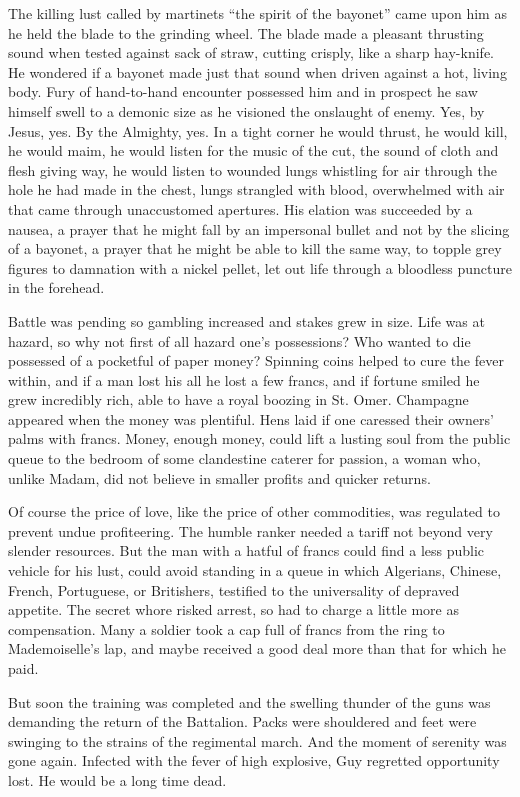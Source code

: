 The killing lust called by martinets ``the spirit of the bayonet'' came upon him as he held the blade to the grinding wheel. The blade made a pleasant thrusting sound when tested against sack of straw, cutting crisply, like a sharp hay-knife. He wondered if a bayonet made just that sound when driven against a hot, living body. Fury of hand-to-hand encounter possessed him and in prospect he saw himself swell to a demonic size as he visioned the onslaught of enemy. Yes, by Jesus, yes. By the Almighty, yes. In a tight corner he would thrust, he would kill, he would maim, he would listen for the music of the cut, the sound of cloth and flesh giving way, he would listen to wounded lungs whistling for air through the hole he had made in the chest, lungs strangled with blood, overwhelmed with air that came through unaccustomed apertures. His elation was succeeded by a nausea, a prayer that he might fall by an impersonal bullet and not by the slicing of a bayonet, a prayer that he might be able to kill the same way, to topple grey figures to damnation with a nickel pellet, let out life through a bloodless puncture in the forehead.

Battle was pending so gambling increased and stakes grew in size. Life was at hazard, so why not first of all hazard one's possessions? Who wanted to die possessed of a pocketful of paper money? Spinning coins helped to cure the fever within, and if a man lost his all he lost a few francs, and if fortune smiled he grew incredibly rich, able to have a royal boozing in St. Omer. Champagne appeared when the money was plentiful. Hens laid if one caressed their owners' palms with francs. Money, enough money, could lift a lusting soul from the public queue to the bedroom of some clandestine caterer for passion, a woman who, unlike Madam, did not believe in smaller profits and quicker returns.

Of course the price of love, like the price of other commodities, was regulated to prevent undue profiteering. The humble ranker needed a tariff not beyond very slender resources. But the man with a hatful of francs could find a less public vehicle for his lust, could avoid standing in a queue in which Algerians, Chinese, French, Portuguese, or Britishers, testified to the universality of depraved appetite. The secret whore risked arrest, so had to charge a little more as compensation. Many a soldier took a cap full of francs from the ring to Mademoiselle's lap, and maybe received a good deal more than that for which he paid.

But soon the training was completed and the swelling thunder of the guns was demanding the return of the Battalion. Packs were shouldered and feet were swinging to the strains of the regimental march. And the moment of serenity was gone again. Infected with the fever of high explosive, Guy regretted opportunity lost. He would be a long time dead.

